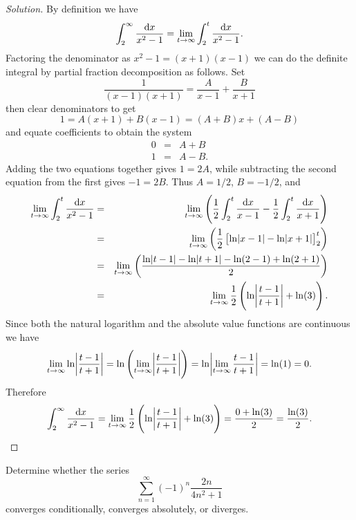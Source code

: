 \documentclass[12pt]{amsart}
\begin{document}
\begin{proof}[Solution]
  By definition we have
  \[\int_2^\infty \frac{\dif x}{x^2 - 1} = \lim_{t \to \infty} \int_2^t \frac{\dif x}{x^2 - 1}.\]
  Factoring the denominator as \(x^2 - 1 = (x + 1)(x - 1)\) we can do the definite integral by partial fraction decomposition as follows.
  Set
  \[\frac{1}{(x - 1)(x + 1)} = \frac{A}{x - 1} + \frac{B}{x + 1}\]
  then clear denominators to get
  \[1 = A(x + 1) + B(x - 1) = (A + B)x + (A - B)\]
  and equate coefficients to obtain the system
  \begin{eqnarray*}
    0 &=& A + B\\
    1 &=& A - B.
  \end{eqnarray*}
  Adding the two equations together gives \(1 = 2A\), while subtracting the second equation from the first gives \(-1 = 2B\).
  Thus \(A = 1/2\), \(B = -1/2\), and
  \begin{eqnarray*}
    \lim_{t \to \infty} \int_2^t \frac{\dif x}{x^2 - 1} &=& \lim_{t \to \infty}\left(\frac{1}{2}\int_2^t \frac{\dif x}{x - 1} - \frac{1}{2} \int_2^t \frac{\dif x}{x + 1}\right)\\
    &=& \lim_{t \to \infty} \left(\frac{1}{2}\left[\ln \abs{x - 1} - \ln\abs{x+1}\right]_2^t\right)\\
    &=& \lim_{t \to \infty} \left(\frac{\ln \abs{t - 1} - \ln\abs{t + 1} - \ln(2 - 1) + \ln(2 + 1)}{2}\right)\\
    &=& \lim_{t \to \infty} \frac{1}{2}\left(\ln\abs{\frac{t - 1}{t + 1}} + \ln(3)\right).
  \end{eqnarray*}
  Since both the natural logarithm and the absolute value functions are continuous we have 
  \[\lim_{t \to \infty} \ln\abs{\frac{t - 1}{t + 1}} = \ln\left(\lim_{t \to \infty} \abs{\frac{t -  1}{t + 1}}\right) = \ln\abs{\lim_{t\to\infty} \frac{t -1}{t + 1}} = \ln(1) = 0.\]
  Therefore
  \[\int_2^\infty \frac{\dif x}{x^2 - 1} =  \lim_{t \to \infty} \frac{1}{2}\left(\ln\abs{\frac{t - 1}{t + 1}} + \ln(3)\right) = \frac{0 + \ln(3)}{2} = \frac{\ln(3)}{2}.\]
\end{proof}

\begin{thm}
  Determine whether the series
  \[\sum_{n = 1}^\infty (-1)^n\frac{2n}{4n^2 + 1}\]
  converges conditionally, converges absolutely, or diverges.
\end{thm}
\end{document}
